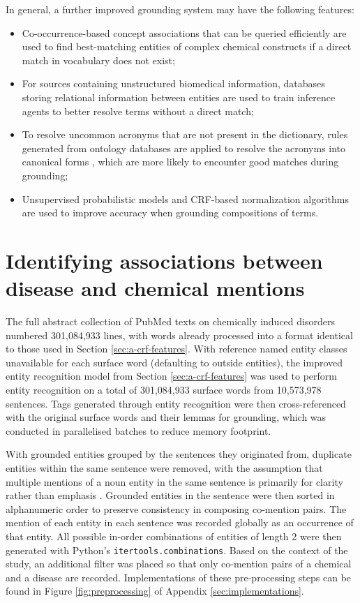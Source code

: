 \documentclass[10pt, oneside]{article}
\begin{document}
In general, a further improved grounding system may have the following features:
\begin{itemize}
	\item Co-occurrence-based concept associations that can be queried efficiently \cite{tsuruoka2008facta} are used to find best-matching entities of complex chemical constructs if a direct match in vocabulary does not exist;
	\item For sources containing unstructured biomedical information, databases storing relational information \cite{kim2005biocontrasts} between entities are used to train inference agents \cite{shin2015incremental} to better resolve terms without a direct match;
	\item To resolve uncommon acronyms that are not present in the dictionary, rules generated from ontology databases are applied to resolve the acronyms into canonical forms \cite{naderi2011organismtagger}, which are more likely to encounter good matches during grounding;
	\item Unsupervised probabilistic models \cite{pecina2010lexical} and CRF-based normalization algorithms \cite{lee2016audis} are used to improve accuracy when grounding compositions of terms.
\end{itemize}

\section{Identifying associations between disease and chemical mentions}

The full abstract collection of PubMed texts on chemically induced disorders numbered 301,084,933 lines, with words already processed into a format identical to those used in Section \ref{sec:a-crf-features}. With reference named entity classes unavailable for each surface word (defaulting to outside entities), the improved entity recognition model from Section \ref{sec:a-crf-features} was used to perform entity recognition on a total of 301,084,933 surface words from 10,573,978 sentences. Tags generated through entity recognition were then cross-referenced with the original surface words and their lemmas for grounding, which was conducted in parallelised batches to reduce memory footprint. 

With grounded entities grouped by the sentences they originated from, duplicate entities within the same sentence were removed, with the assumption that multiple mentions of a noun entity in the same sentence is primarily for clarity rather than emphasis \cite{cortes20092}. Grounded entities in the sentence were then sorted in alphanumeric order to preserve consistency in composing co-mention pairs. The mention of each entity in each sentence was recorded globally as an occurrence of that entity. All possible in-order combinations of entities of length 2 were then generated with Python's \verb|itertools.combinations|. Based on the context of the study, an additional filter was placed so that only co-mention pairs of a chemical and a disease are recorded. Implementations of these pre-processing steps can be found in Figure \ref{fig:preprocessing} of Appendix \ref{sec:implementations}.
\end{document}
